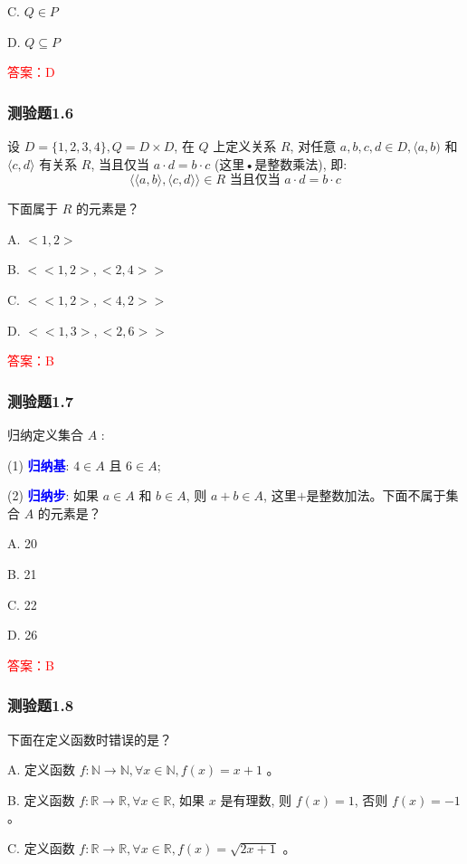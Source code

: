 \documentclass[UTF8, heading=true]{ctexart}
\begin{document}
C. $Q \in P$

D. $Q \subseteq P$

\textcolor{red}{答案：D}

\subsubsection{测验题1.6}

设 $D=\{1,2,3,4\}, Q=D \times D$, 在 $Q$ 上定义关系 $R$, 对任意 $a, b, c, d \in D,\langle a, b)$ 和 $\langle c, d\rangle$ 有关系 $R$, 当且仅当 $a \cdot d=b \cdot c$ (这里•是整数乘法), 即:
$$
\langle\langle a, b\rangle,\langle c, d\rangle\rangle \in R \text { 当且仅当 } a \cdot d=b \cdot c
$$

下面属于 $R$ 的元素是？

A. $<1,2>$

B. $<<1,2>,<2,4>>$

C. $<<1,2>,<4,2>>$

D. $<<1,3>,<2,6>>$

\textcolor{red}{答案：B}

\subsubsection{测验题1.7}

归纳定义集合 $A$ :

(1) \textcolor{blue}{\textbf{归纳基}}: $4 \in A$ 且 $6 \in A$;

(2) \textcolor{blue}{\textbf{归纳步}}: 如果 $a \in A$ 和 $b \in A$, 则 $a+b \in A$, 这里$+$是整数加法。下面不属于集合 $A$ 的元素是？

A. 20

B. 21

C. 22

D. 26

\textcolor{red}{答案：B}

\subsubsection{测验题1.8}

下面在定义函数时错误的是？

A. 定义函数 $f: \mathbb{N} \rightarrow \mathbb{N}, \forall x \in \mathbb{N}, f(x)=x+1$ 。

B. 定义函数 $f: \mathbb{R} \rightarrow \mathbb{R}, \forall x \in \mathbb{R}$, 如果 $x$ 是有理数, 则 $f(x)=1$, 否则 $f(x)=-1$ 。

C. 定义函数 $f: \mathbb{R} \rightarrow \mathbb{R}, \forall x \in \mathbb{R}, f(x)=\sqrt{2 x+1}$ 。
\end{document}
